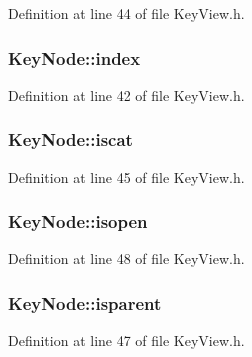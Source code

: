 Definition at line 44 of file Key\+View.\+h.

\subsubsection[{\texorpdfstring{index}{index}}]{ Key\+Node\+::index}\hypertarget{class_key_node_a910a9b97cd2822291152ec789a8fc62e}{}\label{class_key_node_a910a9b97cd2822291152ec789a8fc62e}


Definition at line 42 of file Key\+View.\+h.

\subsubsection[{\texorpdfstring{iscat}{iscat}}]{ Key\+Node\+::iscat}\hypertarget{class_key_node_a6d4ab2121d810e67dda185ca8eb332f6}{}\label{class_key_node_a6d4ab2121d810e67dda185ca8eb332f6}


Definition at line 45 of file Key\+View.\+h.

\subsubsection[{\texorpdfstring{isopen}{isopen}}]{ Key\+Node\+::isopen}\hypertarget{class_key_node_a1bb8cd14f36cf902ddbee9de7320d9fd}{}\label{class_key_node_a1bb8cd14f36cf902ddbee9de7320d9fd}


Definition at line 48 of file Key\+View.\+h.

\subsubsection[{\texorpdfstring{isparent}{isparent}}]{ Key\+Node\+::isparent}\hypertarget{class_key_node_a69342299c1d68228d07fceb86832d906}{}\label{class_key_node_a69342299c1d68228d07fceb86832d906}


Definition at line 47 of file Key\+View.\+h.

